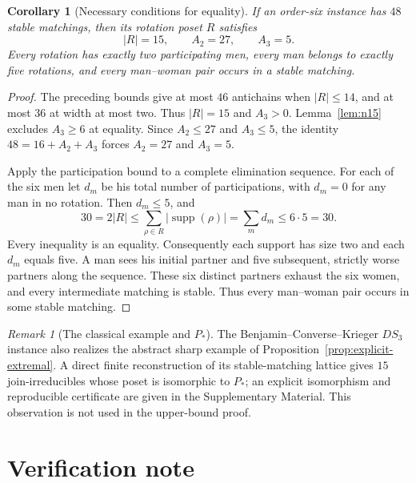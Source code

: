 \documentclass[11pt]{article}
\numberwithin{equation}{section}
\newtheorem{corollary}[theorem]{Corollary}
\theoremstyle{definition}
\theoremstyle{remark}
\newtheorem{remark}[theorem]{Remark}
\newcommand{\supp}{\operatorname{supp}}
\begin{document}
\begin{corollary}[Necessary conditions for equality]\label{cor:equality}
If an order-six instance has $48$ stable matchings, then its rotation poset
$R$ satisfies
\begin{equation}\label{eq:equality-counts}
        |R|=15,\qquad A_2=27,\qquad A_3=5.
\end{equation}
Every rotation has exactly two participating men, every man belongs to
exactly five rotations, and every man--woman pair occurs in a stable matching.
\end{corollary}

\begin{proof}
The preceding bounds give at most $46$ antichains when $|R|\le14$,
and at most $36$ at width at most two.  Thus $|R|=15$ and $A_3>0$.
Lemma~\ref{lem:n15} excludes $A_3\ge6$ at equality.  Since
$A_2\le27$ and $A_3\le5$, the identity $48=16+A_2+A_3$ forces
$A_2=27$ and $A_3=5$.

Apply the participation bound to a complete elimination sequence.  For
each of the six men let $d_m$ be his total number of participations, with
$d_m=0$ for any man in no rotation.  Then $d_m\le5$, and
\begin{equation}\label{eq:equality-incidences}
30=2|R|\le\sum_{\rho\in R}|\supp(\rho)|
       =\sum_m d_m\le6\cdot5=30.
\end{equation}
Every inequality is an equality.  Consequently each support has size two
and each $d_m$ equals five.  A man sees his initial partner and five
subsequent, strictly worse partners along the sequence.  These six distinct
partners exhaust the six women, and every intermediate matching is stable.
Thus every man--woman pair occurs in some stable matching.
\end{proof}

\begin{remark}[The classical example and $P_*$]\label{rem:ds3-pstar}
The Benjamin--Converse--Krieger $DS_3$ instance also realizes the abstract
sharp example of Proposition~\ref{prop:explicit-extremal}.  A direct finite
reconstruction of its stable-matching lattice gives $15$ join-irreducibles
whose poset is isomorphic to $P_*$; an explicit isomorphism and reproducible
certificate are given in the Supplementary Material.  This observation is
not used in the upper-bound proof.
\end{remark}

\section{Verification note}
\end{document}
